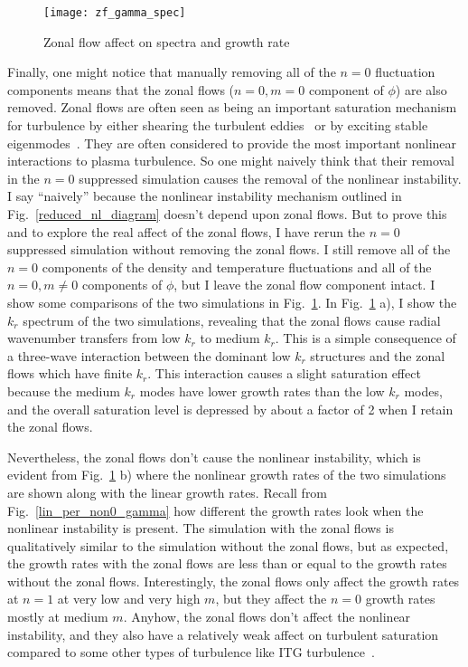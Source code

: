 \begin{figure}[!ht]
\centerline{\texttt{[image: zf\_gamma\_spec]}}
\caption{Zonal flow affect on spectra and growth rate}
\label{zf_gamma_spec}
\end{figure}

Finally, one might notice that manually removing all of the $n=0$ fluctuation components means that the zonal flows ($n=0, m=0$ component of $\phi$) are also removed. 
Zonal flows are often seen as being an important saturation mechanism for turbulence by either shearing the turbulent eddies~\cite{biglari1990} or by exciting stable eigenmodes~\cite{makwana2012}.
They are often considered to provide the most important nonlinear interactions to plasma turbulence. So one might naively think that their removal in the $n=0$ suppressed simulation
causes the removal of the nonlinear instability. I say ``naively'' because the nonlinear instability mechanism outlined in Fig.~\ref{reduced_nl_diagram} doesn't depend upon zonal flows.
But to prove this and to explore the real affect of the zonal flows, I have rerun the $n=0$ suppressed simulation without removing the zonal flows. I still remove all of the $n=0$
components of the density and temperature fluctuations and all of the $n=0, m \ne 0$ components of $\phi$, but I leave the zonal flow component intact. I show some comparisons of the two
simulations in Fig.~\ref{zf_gamma_spec}. In Fig.~\ref{zf_gamma_spec} a), I show the $k_r$ spectrum of the two simulations, revealing that the zonal flows cause radial wavenumber transfers
from low $k_r$ to medium $k_r$. This is a simple consequence of a three-wave interaction between the dominant low $k_r$ structures and the zonal flows which have finite $k_r$. This interaction
causes a slight saturation effect because the medium $k_r$ modes have lower growth rates than the low $k_r$ modes, and the overall saturation level is depressed by about a factor of 2
when I retain the zonal flows.

Nevertheless, the zonal flows don't cause the nonlinear instability, which is evident from Fig.~\ref{zf_gamma_spec} b) where the nonlinear growth rates of the two simulations are shown
along with the linear growth rates. Recall from Fig.~\ref{lin_per_non0_gamma} how different the growth rates look when the nonlinear instability is present.
The simulation with the zonal flows is qualitatively similar to the simulation without the zonal flows, but as expected, the growth rates with the zonal flows are less than or equal to
the growth rates without the zonal flows. Interestingly, the zonal flows only affect the growth rates at $n=1$ at very low and very high $m$, but they affect the $n=0$ growth rates
mostly at medium $m$. Anyhow, the zonal flows don't affect the nonlinear instability, and they also have a relatively weak affect on turbulent saturation compared to some other types
of turbulence like ITG turbulence~\cite{dimits2000,Holland2003}.


